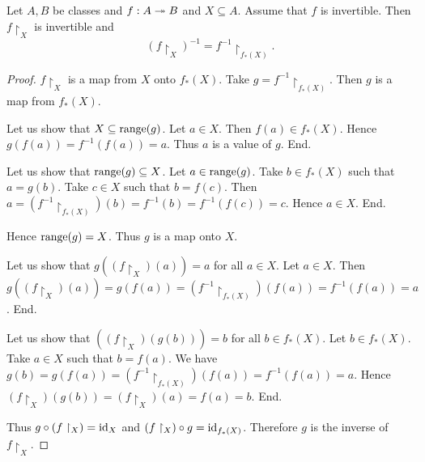 \documentclass[../set-theory.tex]{subfiles}
\begin{document}
  \begin{forthel}
    \begin{proposition}\label{SET_THEORY_09_6374884963778560}
      Let $A, B$ be classes and $f : A \twoheadrightarrow B$ and $X \subseteq A$.
      Assume that $f$ is invertible.
      Then $f \restriction_{X}$ is invertible and
      \[ (f\restriction_{X})^{-1} = f^{-1} \restriction_{f_{*}(X)}. \]
    \end{proposition}
    \begin{proof}
      $f \restriction_{X}$ is a map from $X$ onto $f_{*}(X)$.
      Take $g = f^{-1} \restriction_{f_{*}(X)}$.
      Then $g$ is a map from $f_{*}(X)$.

      Let us show that $X \subseteq \operatorname{range}(g)$.
        Let $a \in X$.
        Then $f(a) \in f_{*}(X)$.
        Hence $g(f(a)) = f^{-1}(f(a)) = a$.
        Thus $a$ is a value of $g$.
      End.

      Let us show that $\operatorname{range}(g) \subseteq X$.
        Let $a \in \operatorname{range}(g)$.
        Take $b \in f_{*}(X)$ such that $a = g(b)$.
        Take $c \in X$ such that $b = f(c)$.
        Then $a = (f^{-1} \restriction_{f_{*}(X)})(b) = f^{-1}(b) = f^{-1}(f(c)) = c$.
        Hence $a \in X$.
      End.

      Hence $\operatorname{range}(g) = X$.
      Thus $g$ is a map onto $X$.

      Let us show that $g((f \restriction_{X})(a)) = a$ for all $a \in X$.
        Let $a \in X$.
        Then $g((f \restriction_{X})(a)) = g(f(a)) = (f^{-1} \restriction_{f_{*}(X)})(f(a)) = f^{-1}(f(a)) = a$.
      End.

      Let us show that $((f \restriction_{X})(g(b))) = b$ for all $b \in f_{*}(X)$.
        Let $b \in f_{*}(X)$.
        Take $a \in X$ such that $b = f(a)$.
        We have $g(b) = g(f(a)) = (f^{-1} \restriction_{f_{*}(X)})(f(a)) = f^{-1}(f(a)) = a$.
        Hence $(f \restriction_{X})(g(b)) = (f \restriction_{X})(a) = f(a) = b$.
      End.

      Thus $g \circ (f \restriction_{X}) = \operatorname{id}_{X}$ and $(f \restriction_{X}) \circ g = \operatorname{id}_{f_{*}(X)}$.
      Therefore $g$ is the inverse of $f \restriction_{X}$.
    \end{proof}
  \end{forthel}
\end{document}
